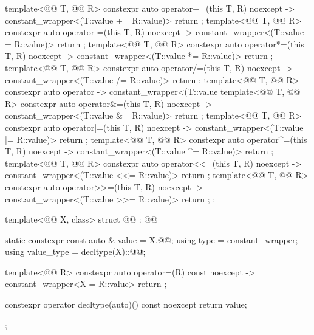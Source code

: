 \begin{codeblock}
{{    template<@@ T, @@ R>
      constexpr auto operator+=(this T, R) noexcept
        -> constant_wrapper<(T::value += R::value)> { return {}; }
    template<@@ T, @@ R>
      constexpr auto operator-=(this T, R) noexcept
        -> constant_wrapper<(T::value -= R::value)> { return {}; }
    template<@@ T, @@ R>
      constexpr auto operator*=(this T, R) noexcept
        -> constant_wrapper<(T::value *= R::value)> { return {}; }
    template<@@ T, @@ R>
      constexpr auto operator/=(this T, R) noexcept
        -> constant_wrapper<(T::value /= R::value)> { return {}; }
    template<@@ T, @@ R>
      constexpr auto operator%
        -> constant_wrapper<(T::value %
    template<@@ T, @@ R>
      constexpr auto operator&=(this T, R) noexcept
        -> constant_wrapper<(T::value &= R::value)> { return {}; }
    template<@@ T, @@ R>
      constexpr auto operator|=(this T, R) noexcept
        -> constant_wrapper<(T::value |= R::value)> { return {}; }
    template<@@ T, @@ R>
      constexpr auto operator^=(this T, R) noexcept
        -> constant_wrapper<(T::value ^= R::value)> { return {}; }
    template<@@ T, @@ R>
      constexpr auto operator<<=(this T, R) noexcept
        -> constant_wrapper<(T::value <<= R::value)> { return {}; }
    template<@@ T, @@ R>
      constexpr auto operator>>=(this T, R) noexcept
        -> constant_wrapper<(T::value >>= R::value)> { return {}; }
  };

  template<@@ X, class>
  struct @@ : @@ {
    static constexpr const auto & value = X.@@;
    using type = constant_wrapper;
    using value_type = decltype(X)::@@;

    template<@@ R>
      constexpr auto operator=(R) const noexcept
        -> constant_wrapper<X = R::value> { return {}; }

    constexpr operator decltype(auto)() const noexcept { return value; }
  };
}
\end{codeblock}

